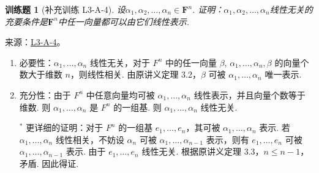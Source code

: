 \documentclass[UTF8,12pt,a4paper,fontset=fandol]{ctexart}
\newtheorem{exercise}{训练题}[section]
\begin{document}
\begin{exercise}[补充训练 L3-A-4]\label{prob:L3-A-4}
设$\alpha_1,\alpha_2,\ldots,\alpha_n\in\mathbf{F}^n$. 证明：$\alpha_1,\alpha_2,\ldots,\alpha_n$线性无关的充要条件是$\mathbf{F}^n$中任一向量都可以由它们线性表示.
\end{exercise}
\noindent 来源：\href{https://github.com/yhwu-is/Linear-Algebra-Left-Undone/blob/new/%E8%AE%B2%E4%B9%89/%E4%B8%93%E9%A2%98/3%20%E6%9C%89%E9%99%90%E7%BB%B4%E7%BA%BF%E6%80%A7%E7%A9%BA%E9%97%B4.tex}{L3-A-4}。
\begin{solve}
\begin{enumerate}
                \item 必要性：$\alpha_1,\ldots,\alpha_n$ 线性无关，对于 $F^n$ 中的任一向量 $\beta$, $\alpha_1,\ldots,\alpha_n,\beta$ 的向量个数大于维数 $n$，则线性相关. 由原讲义定理 3.2，$\beta$ 可被 $\alpha_1,\ldots,\alpha_n$ 唯一表示.

                \item 充分性：由于 $F^n$ 中任意向量均可被 $\alpha_1,\ldots,\alpha_n$ 线性表示，并且向量个数等于维数. 则 $\alpha_1,\ldots,\alpha_n$ 是 $F^n$ 的一组基. 则 $\alpha_1,\ldots,\alpha_n$ 线性无关.

                      $^*$ 更详细的证明：对于 $F^n$ 的一组基 $e_1,\ldots,e_n$，其可被 $\alpha_1,\ldots,\alpha_n$ 表示. 若 $\alpha_1,\ldots,\alpha_n$ 线性相关，不妨设 $\alpha_n$ 可被 $\alpha_1,\ldots,\alpha_{n-1}$ 表示，则有 $e_1,\ldots,e_n$ 可被 $\alpha_1,\ldots,\alpha_{n-1}$ 表示. 由于 $e_1,\ldots,e_n$ 线性无关. 根据原讲义定理 3.3，$n\leqslant n-1$，矛盾. 因此得证.
            \end{enumerate}
\end{solve}
\end{document}
